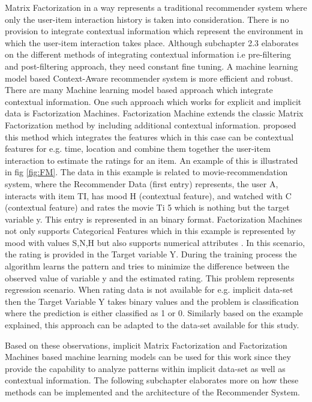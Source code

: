 \Par
Matrix Factorization in a way represents a traditional recommender system where only the user-item interaction history is taken into consideration. There is no provision to integrate contextual information which represent the environment in which the user-item interaction takes place. Although subchapter 2.3 elaborates on the different methods of integrating contextual information i.e pre-filtering and post-filtering approach, they need constant fine tuning. A machine learning model based Context-Aware recommender system is more efficient and robust. There are many Machine learning model based approach which integrate contextual information. One such approach which works for explicit and implicit data is Factorization Machines. Factorization Machine extends the classic Matrix Factorization method by including additional contextual information. \textcite[3]{rendle2011fast}proposed this method which integrates the features which in this case can be contextual features for e.g. time, location and combine them together the user-item interaction to estimate the ratings for an item. An example of this is illustrated in fig \ref{fig:FM}. The data in this example is related to movie-recommendation system, where the Recommender Data (first entry) represents, the user A, interacts with item TI, has mood H (contextual feature), and watched with C (contextual feature) and rates the movie Ti 5 which is nothing but the target variable y.
This entry is represented in an binary format. Factorization Machines not only supports Categorical Features which in this example is represented by mood with values S,N,H but also supports numerical attributes \autocite[2]{rendle2011fast}. In this scenario, the rating is provided in the Target variable Y. During the training process the algorithm learns the pattern and tries to minimize the difference between the observed value of variable y and the estimated rating. This problem represents regression scenario. When rating data is not available for e.g. implicit data-set then the Target Variable Y takes binary values and the problem is classification where the prediction is either classified as 1 or 0. Similarly based on the example explained, this approach can be adapted to the data-set available for this study.  \\
\Par


Based on these observations, implicit Matrix Factorization and Factorization Machines based machine learning models can be used for this work since they provide the capability to analyze patterns within implicit data-set as well as contextual information. The following subchapter elaborates more on how these methods can be implemented and the architecture of the Recommender System. 

